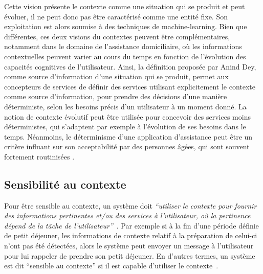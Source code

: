 Cette vision présente le contexte comme une situation qui se produit
et peut évoluer, il ne peut donc pas être caractérisé comme une entité
fixe. Son exploitation est alors soumise à des techniques de
machine-learning.  Bien que différentes, ces deux visions du contextes
peuvent être complémentaires, notamment dans le domaine de
l'assistance domiciliaire, où les informations contextuelles peuvent
varier au cours du temps en fonction de l'évolution des capacités
cognitives de l'utilisateur.
%
Ainsi, la définition proposée par Anind Dey, comme source
d'information d'une situation qui se produit, permet aux concepteurs
de services de définir des services utilisant explicitement le
contexte comme source d'information, pour prendre des décisions d'une
manière déterministe, selon les besoins précis d'un utilisateur à un moment
donné. La notion de contexte évolutif peut être utilisée pour
concevoir des services moins déterministes, qui s'adaptent par exemple
à l'évolution de ses besoins dans le temps.  Néanmoins, le
déterminisme d'une application d'assistance peut être un critère
influant sur son acceptabilité par des personnes âgées, qui sont
souvent fortement routinisées \parencite{caroux2014verification}.
%

\subsection{Sensibilité au contexte}
Pour être sensible au contexte, un système doit {\it ``utiliser le contexte pour 
fournir des informations pertinentes et/ou des services à l'utilisateur, où la 
pertinence dépend de la tâche de l'utilisateur''}~\parencite{dey2001understanding}. Par exemple 
si à la fin d'une période définie de petit déjeuner, les informations de 
contexte relatif à la préparation de celui-ci n'ont pas été détectées, alors le 
système peut envoyer un message à l'utilisateur pour lui rappeler de prendre 
son petit déjeuner. En d'autres termes, un système est dit ``sensible au 
contexte'' si il est capable d'utiliser le contexte~\parencite{alegre2016engineering}. 

